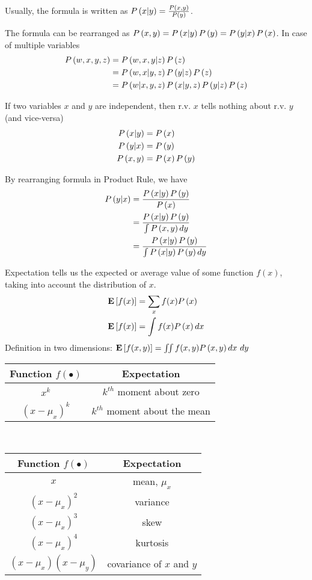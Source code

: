 \begin{description}[leftmargin=0cm]
Usually, the formula is written as $\P{x|y}=\frac{\P{x,y}}{\P{y}}$.
\item[Product Rule] The formula can be rearranged as $\P{x,y}=\P{x|y}\P{y}=\P{y|x}\P{x}$. In case of multiple variables
	\begin{align*}
	\P{w,x,y,z}&=\P{w,x,y|z}\P{z} \\
			   &=\P{w,x|y,z}\P{y|z}\P{z} \\
			   &=\P{w|x,y,z}\P{x|y,z}\P{y|z}\P{z}
	\end{align*}
\item[Independence] If two variables $x$ and $y$ are independent, then r.v. $x$ tells nothing about r.v. $y$ (and vice-versa)
	\begin{align*}
	\P{x|y}&=\P{x} \\
	\P{y|x}&=\P{y} \\
	\P{x,y}&=\P{x}\P{y}
	\end{align*}
\item[Baye's Rule] By rearranging formula in Product Rule, we have
	\begin{align*}
	\P{y|x}&=\frac{\P{x|y}\P{y}}{\P{x}} \\
		   &=\frac{\P{x|y}\P{y}}{\int\P{x,y}dy} \\
		   &=\frac{\P{x|y}\P{y}}{\int\P{x|y}\P{y}dy}
	\end{align*}
\item[Expectation] Expectation tells us the expected or average value of some function $f(x)$, taking into account the distribution of $x$.
	\begin{align*}
	\E{f(x)}&=\sum_x f(x)\P{x} \\
	\E{f(x)}&=\int f(x)\P{x}dx
	\end{align*}
Definition in two dimensions: $\E{f(x,y)}=\iint f(x,y)\P{x,y}dx\ dy$
	\begin{table*}[!h]
		\centering
		\begin{tabular}{|c|c|}
			\hline
			Function $f(\bullet)$ & Expectation \\
			\hline
			$x^k$ & $k^{th}$ moment about zero \\
			\hline
			$(x-\mu_x)^k$ & $k^{th}$ moment about the mean \\
			\hline
		\end{tabular}
		\
		\begin{tabular}{|c|c|}
			\hline
			Function $f(\bullet)$ & Expectation \\
			\hline
			$x$ & mean, $\mu_x$ \\
			\hline
			$(x-\mu_x)^2$ & variance \\
			\hline
			$(x-\mu_x)^3$ & skew \\
			\hline
			$(x-\mu_x)^4$ & kurtosis \\
			\hline
			$(x-\mu_x)(x-\mu_y)$ & covariance of $x$ and $y$ \\
			\hline
		\end{tabular}
	\end{table*}


\end{description}
